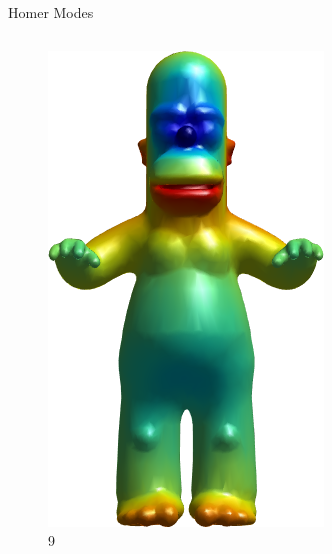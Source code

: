 \documentclass{beamer}
\begin{document}
\begin{frame}{Homer Modes}

\begin{columns}
\begin{column}[T]{3cm}
\begin{figure}[t]
    \includegraphics[width=\textwidth]{Harmonics/HomerModes/9.png}
    \caption*{\huge 9}
\end{figure}
\end{column}
\begin{column}[T]{3cm}
\begin{figure}[t]


\end{figure}
\end{column}
\end{columns}
\end{frame}
\end{document}
